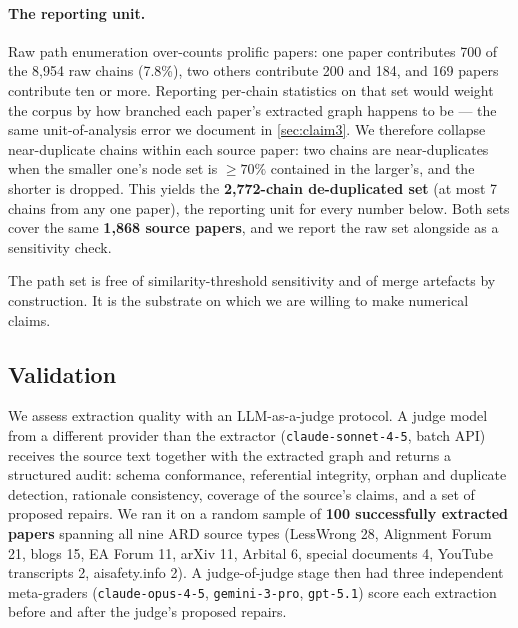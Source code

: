 \documentclass[10pt,twocolumn,letterpaper]{article}
\begin{document}
\paragraph{The reporting unit.} Raw path enumeration over-counts prolific papers:
one paper contributes 700 of the 8{,}954 raw chains (7.8\%), two others
contribute 200 and 184, and 169 papers contribute ten or more. Reporting
per-chain statistics on that set would weight the corpus by how branched each
paper's extracted graph happens to be --- the same unit-of-analysis error we
document in \cref{sec:claim3}. We therefore collapse near-duplicate chains within
each source paper: two chains are near-duplicates when the smaller one's node set
is $\geq 70\%$ contained in the larger's, and the shorter is dropped. This yields
the \textbf{2{,}772-chain de-duplicated set} (at most 7 chains from any one
paper), the reporting unit for every number below. Both sets cover the same
\textbf{1{,}868 source papers}, and we report the raw set alongside as a
sensitivity check.

The path set is free of similarity-threshold sensitivity and of merge artefacts
by construction. It is the substrate on which we are willing to make numerical
claims.

\subsection{Validation}
\label{sec:validation}

We assess extraction quality with an LLM-as-a-judge protocol. A judge model from
a different provider than the extractor (\texttt{claude-sonnet-4-5}, batch API)
receives the source text together with the extracted graph and returns a
structured audit: schema conformance, referential integrity, orphan and duplicate
detection, rationale consistency, coverage of the source's claims, and a set of
proposed repairs. We ran it on a random sample of \textbf{100 successfully
extracted papers} spanning all nine ARD source types (LessWrong 28, Alignment
Forum 21, blogs 15, EA Forum 11, arXiv 11, Arbital 6, special documents 4,
YouTube transcripts 2, aisafety.info 2). A judge-of-judge stage then had three
independent meta-graders (\texttt{claude-opus-4-5}, \texttt{gemini-3-pro},
\texttt{gpt-5.1}) score each extraction before and after the judge's proposed
repairs.
\end{document}
